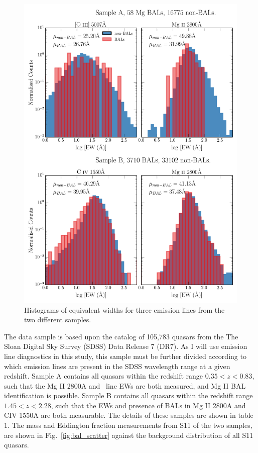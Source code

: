 \begin{figure} %
\centering
\includegraphics[width=1.0\textwidth]{figures/ewpaper/ew_hist_qsos.png}
\caption
{
Histograms of equivalent widths for three emission lines from the two different samples.
}
\label{fig:ew_hists}
\end{figure} %

The data sample is based upon the
\citet[][hereafter S11]{shen2011} catalog of
105,783 quasars from the The Sloan Digital Sky Survey (SDSS) 
Data Release 7 (DR7). 
As I will use emission line diagnostics in this study,
this sample must be further divided according to which 
emission lines are present in 
the SDSS wavelength range at a given redshift. 
Sample A contains all quasars within the redshift range $0.35<z<0.83$, 
such that the Mg II 2800A and \oiiifull\ line EWs are both measured, 
and Mg II BAL identification
is possible.  Sample B contains all quasars within the redshift 
range $1.45<z<2.28$, such that 
the EWs and presence of BALs in Mg II 2800A and CIV 1550A are both measurable.
The details of these samples are shown in table 1.
The mass and Eddington fraction measurements from S11 of the two samples,
are shown in Fig.~\ref{fig:bal_scatter}
against the background distribution of all S11 quasars.

